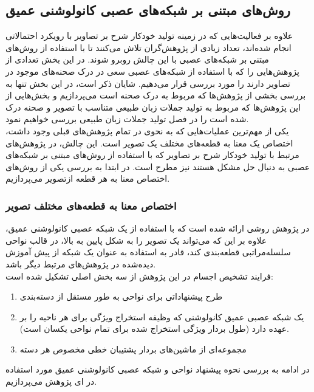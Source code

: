\subsection{روش‌های مبتنی بر شبکه‌های عصبی کانولوشنی عمیق}

علاوه بر فعالیت‌هایی که در زمینه تولید خودکار شرح بر تصاویر با رویکرد احتمالاتی انجام شده‌اند، تعداد زیادی از پژوهش‌گران تلاش می‌کنند تا با استفاده از روش‌‌های مبتنی بر شبکه‌های عصبی با این چالش روبرو شوند. در این بخش تعدادی از پژوهش‌هایی را که با استفاده از شبکه‌های عصبی سعی در درک صحنه‌های موجود در تصاویر دارند را مورد بررسی قرار می‌دهیم. شایان ذکر است، در این بخش تنها به بررسی بخشی از پژوهش‌ها که مربوط به درک صحنه است می‌پردازیم و بخش‌هایی از این پژوهش‌ها که مربوط به تولید جملات زبان طبیعی متناسب با تصویر و صحنه درک شده است را در فصل تولید جملات زبان طبیعی بررسی خواهیم نمود.
\\
یکی از مهم‌ترین عملیات‌هایی که به نحوی در تمام پژوهش‌های قبلی وجود داشت، اختصاص یک معنا به قطعه‌های مختلف یک تصویر است. این چالش، در پژوهش‌های مرتبط با تولید خودکار شرح بر تصاویر که با استفاده از روش‌های مبتنی بر شبکه‌های عصبی به دنبال حل مشکل هستند نیز مطرح است. در ابتدا به بررسی یکی از روش‌های اختصاص معنا به هر قطعه ازتصویر می‌پردازیم.

\subsubsection[اختصاص معنا به قطعه‌های مختلف تصویر]{اختصاص معنا به قطعه‌های مختلف تصویر\cite{Girshick_2014_CVPR}}
در پژوهش 
\cite{Girshick_2014_CVPR}
روشی ارائه شده است که با استفاده از یک شبکه عصبی کانولوشنی عمیق، علاوه بر این که می‌تواند یک تصویر را به شکل پایین به بالا، در قالب نواحی سلسله‌مراتبی قطعه‌بندی کند، قادر به استفاده به عنوان یک شبکه از پیش آموزش  دیده‌شده در پژوهش‌های مرتبط دیگر باشد.
\\
فرایند تشخیص اجسام در این پژوهش از سه بخش اصلی تشکیل شده است:
\begin{enumerate}
\item
طرح پیشنهاداتی برای نواحی به طور مستقل از دسته‌بندی
\item 
یک شبکه عصبی عمیق کانولوشنی که وظیفه استخراج ویژگی برای هر ناحیه را بر عهده دارد (طول بردار ويژگی استخراج شده برای تمام نواحی یکسان است).
\item
مجموعه‌ای از ماشین‌های بردار پشتیبان خطی مخصوص هر دسته
\end{enumerate}
در ادامه به بررسی نحوه پیشنهاد نواحی و شبکه عصبی کانولوشنی عمیق مورد استفاده در ای پژوهش می‌پردازیم.

